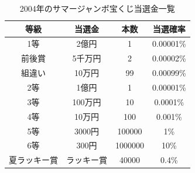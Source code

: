 \begin{table}[hb]
	\centering
	\caption{2004年のサマージャンボ宝くじ当選金一覧}
	\begin{tabular}{cccc}
		等級     & 当選金   & 本数      & 当選確率      \\\hline
		1等     & 2億円   & 1       & 0.00001\% \\
		前後賞    & 5千万円  & 2       & 0.00002\% \\
		組違い    & 10万円  & 99      & 0.00099\% \\
		2等     & 1億円   & 1       & 0.00001\% \\
		3等     & 100万円 & 10      & 0.0001\%  \\
		4等     & 10万円  & 100     & 0.001\%   \\
		5等     & 3000円 & 100000  & 1\%       \\
		6等     & 300円  & 1000000 & 10\%      \\
		夏ラッキー賞 & ラッキー賞 & 40000   & 0.4\%     \\
	\end{tabular}
	\label{takarakuji}
\end{table}
